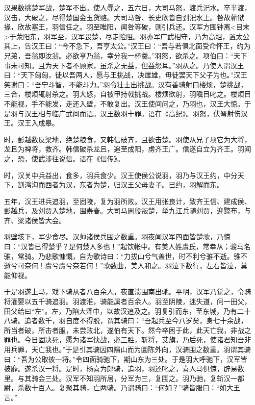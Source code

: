 \documentclass[]{article}
\begin{document}
汉果数挑楚军战，楚军不出。使人辱之，五六日，大司马怒，渡兵汜水。卒半渡，汉击，大破之，尽得楚国金玉货赂。大司马咎、长史欣皆自刭汜水上。咎故蕲狱掾，欣故塞王，羽信任之。羽至睢阳，闻咎等破，则引兵还。汉军方围钟离\textless{}目末\textgreater{}于荥阳东，羽军至，汉军畏楚，尽走险阻。羽亦军广武相守，乃为高俎，置太公其上，告汉王曰：``今不急下，吾亨太公。''汉王曰：``吾与若俱北面受命怀王，约为兄弟，吾翁即汝翁。必欲亨乃翁，幸分我一杯羹。''羽怒，欲杀之。项伯曰：``天下事未可知。且为天下者不顾家，虽杀之无益，但益怨耳。''羽从之。乃使人谓汉王曰：``天下匈匈，徒以吾两人，愿与王挑战，决雌雄，毋徒罢天下父子为也。''汉王笑谢曰：``吾宁斗智，不能斗力。''羽令壮士出挑战。汉有善骑射曰楼烦，楚挑战，三合，楼烦辄射杀之。羽大怒，自被甲持戟挑战。楼烦欲射，羽瞋目叱之。楼烦目不能视，手不能发，走还入壁，不敢复出。汉王使间问之，乃羽也，汉王大惊。于是羽与汉王相与临广武间而语。汉王数羽十罪。语在《高纪》。羽怒，伏弩射伤汉王。汉王入成皋。

时，彭越数反梁地，绝楚粮食，又韩信破齐，且欲击楚。羽使从兄子项它为大将，龙且为裨将，救齐。韩信破杀龙且，追至成阳，虏齐王广。信遂自立为齐王。羽闻之，恐，使武涉往说信。语在《信传》。

时，汉关中兵益出，食多，羽兵食少。汉王使侯公说羽，羽乃与汉王约，中分天下，割鸿沟而西者为汉，东者为楚，归汉王父母妻子。已约，羽解而东。

五年，汉王进兵追羽，至固陵，复为羽所败。汉王用张良计，致齐王信、建成侯、彭越兵，及刘贾入楚地，围寿春。大司马周殷叛楚，举九江兵随刘贾，迎黥布，与齐、梁诸侯皆大会。

羽壁垓下，军少食尽。汉帅诸侯兵围之数重。羽夜闻汉军四面皆楚歌，乃惊曰：``汉皆已得楚乎？是何楚人多也！''起饮帐中。有美人姓虞氏，常幸从；骏马名骓，常骑。乃悲歌慷慨，自为歌诗曰：``力拔山兮气盖世，时不利兮骓不逝。骓不逝兮可奈何！虞兮虞兮奈若何！''歌数曲，美人和之。羽泣下数行，左右皆泣，莫能仰视。

于是羽遂上马，戏下骑从者八百余人，夜直溃围南出驰。平明，汉军乃觉之，令骑将灌婴以五千骑追羽。羽渡淮，骑能属者百余人。羽至阴陵，迷失道，问一田父，田父给曰``左''。左，乃陷大泽中，以故汉追及之。羽复引而东，至东城，乃有二十八骑。追者数千，羽自度不得脱，谓其骑曰：``吾起兵至今八岁矣，身七十余战，所当者破，所击者服，未尝败北，遂伯有天下。然今卒困于此，此天亡我，非战之罪也。今日固决死，愿为诸军快战，必三胜，斩将，艾旗，乃后死，使诸君知吾非用兵罪，天亡我也。''于是引其骑因四隤山而为圜陈外向，汉骑围之数重。羽谓其骑曰：``吾为公取彼一将。''令四面骑驰下，期山东为三处。于是羽大呼驰下，汉军皆披靡。遂杀汉一将。是时，杨喜为郎骑，追羽，羽还叱之，喜人马俱惊，辟易数里。与其骑会三处。汉军不知羽所居，分军为三，复围之。羽乃驰，复斩汉一都尉，杀数十百人。复聚其骑，亡两骑。乃谓骑曰：``何如？''骑皆服曰：``如大王言。''
\end{document}
